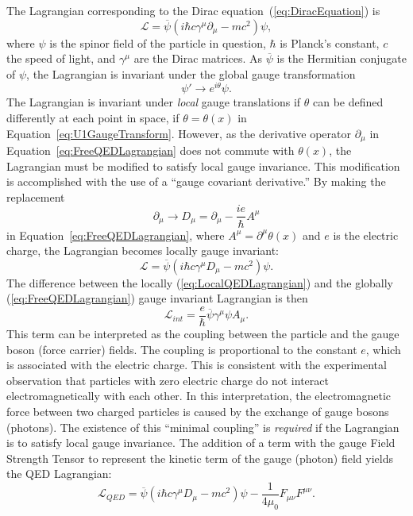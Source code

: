 The Lagrangian corresponding to the Dirac equation~(\ref{eq:DiracEquation}) is
\begin{equation}
  \mathcal{L} = \overline \psi (i\hbar c\gamma^\mu \partial_\mu - mc^2) \psi,
  \label{eq:FreeQEDLagrangian}
\end{equation}
where $\psi$ is the spinor field of the particle in question, $\hbar$ is Planck's
constant, $c$ the speed of light, and $\gamma^\mu$ are the Dirac matrices.  As
$\overline\psi$ is the Hermitian conjugate of $\psi$, the Lagrangian is invariant
under the global gauge transformation 
\begin{equation}
  \psi' \to e^{i\theta}\psi.
  \label{eq:U1GaugeTransform}
\end{equation}
The Lagrangian is invariant under \emph{local} gauge translations if $\theta$
can be defined differently at each point in space, \ie if $\theta = \theta(x)$
in Equation~\ref{eq:U1GaugeTransform}.  However, as the derivative operator
$\partial_\mu$ in Equation~\ref{eq:FreeQEDLagrangian} does not commute with
$\theta(x)$, the Lagrangian must be modified to satisfy local gauge invariance.
This modification is accomplished with the use of a ``gauge covariant
derivative.''  By making the replacement 
\begin{equation} 
  \partial_\mu \to D_\mu = \partial_\mu - \frac{ie}{\hbar}A^\mu      
  \nonumber
\end{equation}
in Equation~\ref{eq:FreeQEDLagrangian}, where 
$A^\mu = \partial^\mu \theta(x)$ and $e$ is the electric charge, the Lagrangian
becomes locally gauge invariant:
\begin{equation}
  \mathcal{L} = \overline \psi (i\hbar c\gamma^\mu D_\mu - mc^2) \psi.
  \label{eq:LocalQEDLagrangian}
\end{equation}
The difference between
the locally (\ref{eq:LocalQEDLagrangian}) and the globally 
(\ref{eq:FreeQEDLagrangian}) gauge invariant Lagrangian is then
\begin{equation}
  \mathcal{L}_{int} = \frac{e}{\hbar}\overline\psi\gamma^\mu\psi A_\mu.
  \nonumber
\end{equation}
This term can be interpreted as the coupling between the particle and the gauge
boson (force carrier) fields.  The coupling is proportional to the constant $e$,
which is associated with the electric charge.  This is consistent with the
experimental observation that particles with zero electric charge do not
interact electromagnetically with each other.  In this interpretation, the
electromagnetic force between two charged particles is caused by the exchange of
gauge bosons (photons).  The existence of this ``minimal coupling'' is
\emph{required} if the Lagrangian is to satisfy local gauge invariance. The
addition of a term with the gauge Field Strength Tensor to represent the kinetic
term of the gauge (photon) field yields the QED Lagrangian:
\begin{equation}
  \mathcal{L}_{QED} = \overline \psi (i\hbar c\gamma^\mu D_\mu - mc^2) \psi -
  \frac{1}{4\mu_0}F_{\mu\nu}F^{\mu\nu}.
  \nonumber
\end{equation}

